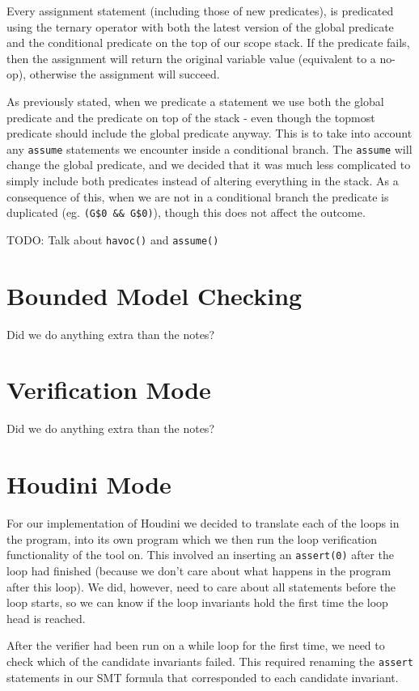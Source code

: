 \documentclass[11pt]{article}
\begin{document}
Every assignment statement (including those of new predicates), is predicated using the ternary operator with both the latest version of the global predicate and the conditional predicate on the top of our scope stack. If the predicate fails, then the assignment will return the original variable value (equivalent to a no-op), otherwise the assignment will succeed.

As previously stated, when we predicate a statement we use both the global predicate and the predicate on top of the stack - even though the topmost predicate should include the global predicate anyway. This is to take into account any \verb|assume| statements we encounter inside a conditional branch. The \verb|assume| will change the global predicate, and we decided that it was much less complicated to simply include both predicates instead of altering everything in the stack. As a consequence of this, when we are not in a conditional branch the predicate is duplicated (eg. \verb|(G$0 && G$0)|), though this does not affect the outcome.

TODO: Talk about \verb|havoc()| and \verb|assume()|

\section{Bounded Model Checking}

Did we do anything extra than the notes?

\section{Verification Mode}

Did we do anything extra than the notes?

\section{Houdini Mode}

For our implementation of Houdini we decided to translate each of the loops in the program, into its own program which we then run the loop verification functionality of the tool on. This involved an inserting an \verb|assert(0)| after the loop had finished (because we don't care about what happens in the program after this loop). We did, however, need to care about all statements before the loop starts, so we can know if the loop invariants hold the first time the loop head is reached.

After the verifier had been run on a while loop for the first time, we need to check which of the candidate invariants failed. This required renaming the \verb|assert| statements in our SMT formula that corresponded to each candidate invariant.
\end{document}
